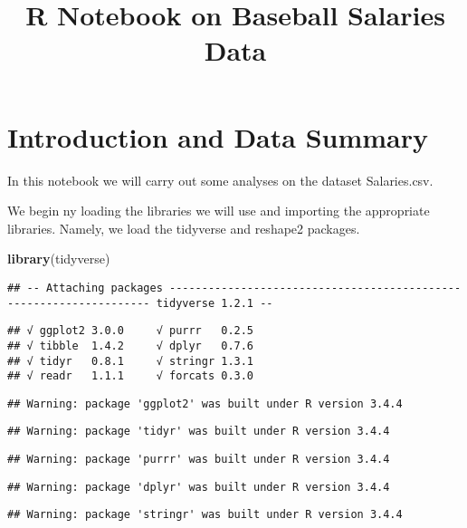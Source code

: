 \documentclass[]{article}
\title{R Notebook on Baseball Salaries Data}
\author{}
\date{}
\newenvironment{Shaded}{\begin{snugshade}}{\end{snugshade}}
\newcommand{\KeywordTok}[1]{\textcolor[rgb]{0.13,0.29,0.53}{\textbf{#1}}}
\newcommand{\NormalTok}[1]{#1}
\begin{document}
\maketitle

\section{Introduction and Data
Summary}\label{introduction-and-data-summary}

In this notebook we will carry out some analyses on the dataset
Salaries.csv.

We begin ny loading the libraries we will use and importing the
appropriate libraries. Namely, we load the tidyverse and reshape2
packages.

\begin{Shaded}
\begin{Highlighting}[]
\KeywordTok{library}\NormalTok{(tidyverse)}
\end{Highlighting}
\end{Shaded}

\begin{verbatim}
## -- Attaching packages ------------------------------------------------------------------- tidyverse 1.2.1 --
\end{verbatim}

\begin{verbatim}
## √ ggplot2 3.0.0     √ purrr   0.2.5
## √ tibble  1.4.2     √ dplyr   0.7.6
## √ tidyr   0.8.1     √ stringr 1.3.1
## √ readr   1.1.1     √ forcats 0.3.0
\end{verbatim}

\begin{verbatim}
## Warning: package 'ggplot2' was built under R version 3.4.4
\end{verbatim}

\begin{verbatim}
## Warning: package 'tidyr' was built under R version 3.4.4
\end{verbatim}

\begin{verbatim}
## Warning: package 'purrr' was built under R version 3.4.4
\end{verbatim}

\begin{verbatim}
## Warning: package 'dplyr' was built under R version 3.4.4
\end{verbatim}

\begin{verbatim}
## Warning: package 'stringr' was built under R version 3.4.4
\end{verbatim}
\end{document}
